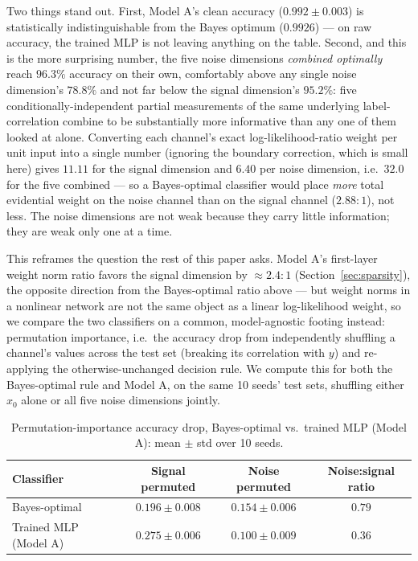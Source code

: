 \documentclass[11pt]{article}
\begin{document}
Two things stand out. First, Model A's clean accuracy ($0.992\pm0.003$) is
statistically indistinguishable from the Bayes optimum ($0.9926$) --- on
raw accuracy, the trained MLP is not leaving anything on the table.
Second, and this is the more surprising number, the five noise dimensions
\emph{combined optimally} reach $96.3\%$ accuracy on their own, comfortably
above any single noise dimension's $78.8\%$ and not far below the signal
dimension's $95.2\%$: five conditionally-independent partial measurements
of the same underlying label-correlation combine to be substantially more
informative than any one of them looked at alone. Converting each
channel's exact log-likelihood-ratio weight per unit input into a single
number (ignoring the boundary correction, which is small here) gives
$11.11$ for the signal dimension and $6.40$ per noise dimension, i.e.\
$32.0$ for the five combined --- so a Bayes-optimal classifier would place
\emph{more} total evidential weight on the noise channel than on the
signal channel ($2.88{:}1$), not less. The noise dimensions are not weak
because they carry little information; they are weak only one at a time.

This reframes the question the rest of this paper asks. Model A's
first-layer weight norm ratio favors the signal dimension by
$\approx 2.4{:}1$ (Section~\ref{sec:sparsity}), the opposite direction
from the Bayes-optimal ratio above --- but weight norms in a nonlinear
network are not the same object as a linear log-likelihood weight, so we
compare the two classifiers on a common, model-agnostic footing instead:
permutation importance, i.e.\ the accuracy drop from independently
shuffling a channel's values across the test set (breaking its
correlation with $y$) and re-applying the otherwise-unchanged decision
rule. We compute this for both the Bayes-optimal rule and Model A, on the
same 10 seeds' test sets, shuffling either $x_0$ alone or all five noise
dimensions jointly.

\begin{table}[h]
\centering
\caption{Permutation-importance accuracy drop, Bayes-optimal vs.\ trained
MLP (Model A): mean $\pm$ std over 10 seeds.}
\label{tab:permimportance}
\begin{tabular}{lccc}
\toprule
Classifier & Signal permuted & Noise permuted & Noise:signal ratio \\
\midrule
Bayes-optimal & $0.196\pm0.008$ & $0.154\pm0.006$ & $0.79$ \\
Trained MLP (Model A) & $0.275\pm0.006$ & $0.100\pm0.009$ & $0.36$ \\
\bottomrule
\end{tabular}
\end{table}
\end{document}
